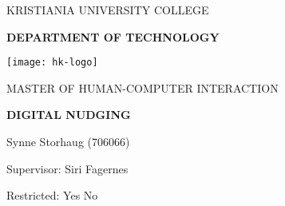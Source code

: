 \begin{titlepage}
    \begin{center}
        \large
        \MakeUppercase{KRISTIANIA UNIVERSITY COLLEGE}
        
        \LARGE
        \textbf{\MakeUppercase{DEPARTMENT OF TECHNOLOGY}}
        
        \vspace{1cm}
        \texttt{[image: hk-logo]}
        
        \vspace{1cm}
        \Large
        \MakeUppercase{MASTER OF HUMAN-COMPUTER INTERACTION}
        
        \vspace{0.5cm}
        \LARGE
        \textbf{DIGITAL NUDGING}
        
        \vspace{0.5cm}
        \Large
        Synne Storhaug (706066)
        
        \vspace{3.5cm}
        \large
        Supervisor: Siri Fagernes 

        \vspace{1.5cm}        
        Restricted:
        \uncheckedbox Yes
        \checkedbox No
    \end{center}
\end{titlepage}